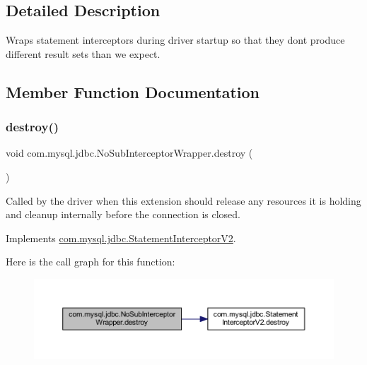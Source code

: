 \subsection{Detailed Description}
Wraps statement interceptors during driver startup so that they don\textquotesingle{}t produce different result sets than we expect. 

\subsection{Member Function Documentation}
\mbox{\label{classcom_1_1mysql_1_1jdbc_1_1_no_sub_interceptor_wrapper_ae579d5fb41efef1fff171752d736d4f5}} 
\subsubsection{\texorpdfstring{destroy()}{destroy()}}
{\footnotesize\ttfamily void com.\+mysql.\+jdbc.\+No\+Sub\+Interceptor\+Wrapper.\+destroy (\begin{DoxyParamCaption}{ }\end{DoxyParamCaption})}

Called by the driver when this extension should release any resources it is holding and cleanup internally before the connection is closed. 

Implements \mbox{\hyperlink{interfacecom_1_1mysql_1_1jdbc_1_1_statement_interceptor_v2_a00bfb3d3f7b81e16a9cdf4784150c3f7}{com.\+mysql.\+jdbc.\+Statement\+Interceptor\+V2}}.

Here is the call graph for this function\+:
\nopagebreak
\begin{figure}[H]
\begin{center}
\leavevmode
\includegraphics[width=350pt]{classcom_1_1mysql_1_1jdbc_1_1_no_sub_interceptor_wrapper_ae579d5fb41efef1fff171752d736d4f5_cgraph}
\end{center}
\end{figure}
\mbox{\label{classcom_1_1mysql_1_1jdbc_1_1_no_sub_interceptor_wrapper_a3688c515a37ae2f36b8f59ae51304ac4}} 
